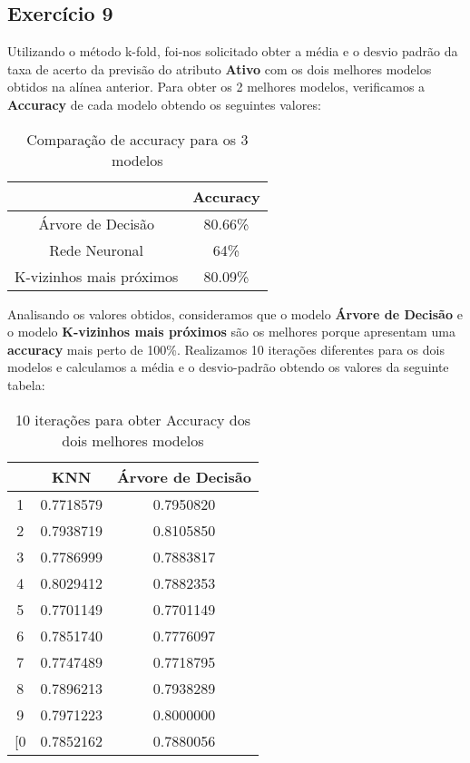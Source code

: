 \subsection{Exercício 9}
Utilizando o método k-fold, foi-nos solicitado obter a média e o desvio padrão da taxa de acerto da previsão do atributo \textbf{Ativo} com os dois melhores modelos obtidos na alínea anterior.
Para obter os 2 melhores modelos, verificamos a \textbf{Accuracy} de cada modelo obtendo os seguintes valores:

\begin{table}[htbp]
	\caption{Comparação de accuracy para os 3 modelos}
    \begin{center}
    \begin{tabular}{|c|c|}
    \hline
    & \textbf{Accuracy}\\
    \hline
    Árvore de Decisão & 80.66\% \\
    \hline
    Rede Neuronal & 64\% \\
    \hline
    K-vizinhos mais próximos & 80.09\% \\
    \hline
    \end{tabular}
    \label{tab:my_label}
    \end{center}
\end{table}

Analisando os valores obtidos, consideramos que o modelo \textbf{Árvore de Decisão} e o modelo \textbf{K-vizinhos mais próximos} são os melhores porque apresentam uma \textbf{accuracy} mais perto de 100\%.
Realizamos 10 iterações diferentes para os dois modelos e calculamos a média e o desvio-padrão obtendo os valores da seguinte tabela:

\begin{table}[htbp]
	\caption{10 iterações para obter Accuracy dos dois melhores modelos }
    \begin{center}
        \begin{tabular}{|c|c|c|}
        \hline
        & \textbf{KNN} & \textbf{Árvore de Decisão}\\
        \hline
        1 & 0.7718579 & 0.7950820 \\
        \hline
        2 & 0.7938719 & 0.8105850 \\
        \hline
        3 & 0.7786999 & 0.7883817 \\
        \hline
        4 & 0.8029412 & 0.7882353 \\
        \hline
        5 & 0.7701149 & 0.7701149 \\
        \hline
        6 & 0.7851740 & 0.7776097 \\
        \hline
        7 & 0.7747489 & 0.7718795 \\
        \hline
        8 & 0.7896213 & 0.7938289 \\
        \hline
        9 & 0.7971223 & 0.8000000 \\
        \hline
        [0 & 0.7852162 & 0.7880056 \\
        \hline
        \end{tabular}
    \label{tab_9}
    \end{center}
\end{table}


